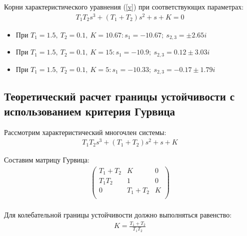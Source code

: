 \documentclass[a4paper,12pt]{article}
\begin{document}
	\par
	Корни характеристического уравнения (\ref{v}) при соответствующих параметрах:\\
	\begin{gather}
	T_1T_2s^3+(T_1+T_2)s^2+s+K=0 \label{v}
	\end{gather}



	\begin{itemize}
		\item При $T_1=1.5,~T_2=0.1,~K=10.67: s_1=-10.67;~ s_{2,3}=\pm 2.65i$\\
		\item При $T_1=1.5,~T_2=0.1,~K=15: s_1=-10.9;~ s_{2,3}=0.12\pm 3.03i$\\
		\item При $T_1=1.5,~T_2=0.1,~K=5: s_1=-10.33;~ s_{2,3}=-0.17\pm 1.79i$\\
	\end{itemize}

	\clearpage
	\begin{center}
	\section{Теоретический расчет границы устойчивости с использованием критерия Гурвица}
	\end{center}
	\noindent
	
	 Рассмотрим характеристический многочлен системы:\\
	\begin{gather}
	T_1T_2s^3+(T_1+T_2)s^2+s+K
	\end{gather}
	\par
\noindent	 Составим матрицу Гурвица:\\
	\begin{gather}
	 \left( \begin{matrix} 
	T_1+T_2 & K & 0 \\ 
	T_1T_2 & 1 & 0 \\ 
	0 & T_1+T_2 & K \\ 
	\end{matrix} \right) 
	\end{gather}
\\
	Для колебательной границы устойчивости должно выполняться равенство:\\
	\begin{gather} 
	 K=\displaystyle\frac{T_1+T_2}{T_1T_2}
	 \end{gather}\\
	 
\end{document}
